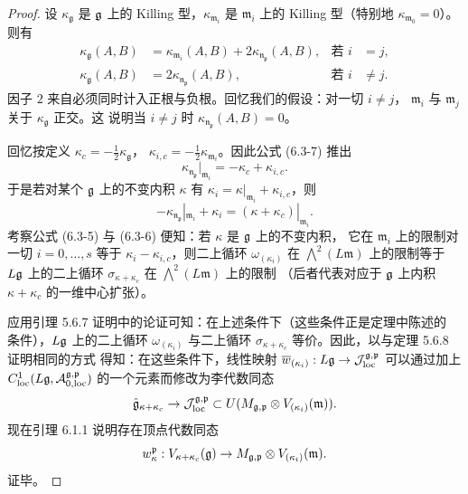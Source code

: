 \begin{proof}
    设 $\kappa_{\mathfrak g}$ 是 $\mathfrak{g}$ 上的 Killing 型，$\kappa_{\mathfrak m_i}$
    是 $\mathfrak m_i$ 上的 Killing 型（特别地 $\kappa_{\mathfrak m_0}=0$）。
    则有
    \begin{equation}
        \begin{aligned}
            \kappa_{\mathfrak g}(A,B)
            &=\kappa_{\mathfrak m_i}(A,B)
            +2\kappa_{\mathfrak n_{\mathfrak p}}(A,B),
            &\text{若 } i&=j,\\
            \kappa_{\mathfrak g}(A,B)
            &=2\kappa_{\mathfrak n_{\mathfrak p}}(A,B),
            &\text{若 } i&\ne j.
        \end{aligned}
        \tag{6.3-7}
    \end{equation}
    因子 $2$ 来自必须同时计入正根与负根。回忆我们的假设：对一切 $i\ne j$，
    $\mathfrak m_i$ 与 $\mathfrak m_j$ 关于 $\kappa_{\mathfrak g}$ 正交。这
    说明当 $i\ne j$ 时 $\kappa_{\mathfrak n_{\mathfrak p}}(A,B)=0$。

    回忆按定义 $\kappa_c=-\frac12\kappa_{\mathfrak g}$，
    $\kappa_{i,c}=-\frac12\kappa_{\mathfrak m_i}$。因此公式 (6.3-7) 推出
    \[
        \kappa_{\mathfrak n_{\mathfrak p}}|_{\mathfrak m_i}
        =-\kappa_c+\kappa_{i,c}.
    \]
    于是若对某个 $\mathfrak{g}$ 上的不变内积 $\kappa$ 有
    $\kappa_i=\kappa|_{\mathfrak m_i}+\kappa_{i,c}$，则
    \[
        -\kappa_{\mathfrak n_{\mathfrak p}}|_{\mathfrak m_i}+\kappa_i
        =(\kappa+\kappa_c)|_{\mathfrak m_i}.
    \]
    考察公式 (6.3-5) 与 (6.3-6) 便知：若 $\kappa$ 是 $\mathfrak{g}$ 上的不变内积，
    它在 $\mathfrak m_i$ 上的限制对一切 $i=0,\dots,s$ 等于
    $\kappa_i-\kappa_{i,c}$，则二上循环 $\omega_{(\kappa_i)}$ 在
    $\bigwedge^2(L\mathfrak m)$ 上的限制等于 $L\mathfrak{g}$ 上的二上循环
    $\sigma_{\kappa+\kappa_c}$ 在 $\bigwedge^2(L\mathfrak m)$ 上的限制
    （后者代表对应于 $\mathfrak{g}$ 上内积 $\kappa+\kappa_c$ 的一维中心扩张）。

    应用引理 5.6.7 证明中的论证可知：在上述条件下（这些条件正是定理中陈述的
    条件），$L\mathfrak{g}$ 上的二上循环 $\omega_{(\kappa_i)}$ 与二上循环
    $\sigma_{\kappa+\kappa_c}$ 等价。因此，以与定理 5.6.8 证明相同的方式
    得知：在这些条件下，线性映射
    $\overline w_{(\kappa_i)}:L\mathfrak{g}\to
    \mathcal{J}^{\mathfrak g,\mathfrak p}_{\mathrm{loc}}$ 可以通过加上
    $C^1_{\mathrm{loc}}(L\mathfrak{g},\mathcal{A}^{\mathfrak g,\mathfrak p}_{0,\mathrm{loc}})$
    的一个元素而修改为李代数同态
    \[
        \hat{\mathfrak{g}}_{\kappa+\kappa_c}\to\mathcal{J}^{\mathfrak g,\mathfrak p}_{\mathrm{loc}}
        \subset U(M_{\mathfrak g,\mathfrak p}\otimes
        V_{(\kappa_i)}(\mathfrak m)).
    \]
    现在引理 6.1.1 说明存在顶点代数同态
    \[
        w^{\mathfrak p}_\kappa:V_{\kappa+\kappa_c}(\mathfrak{g})
        \to M_{\mathfrak g,\mathfrak p}\otimes V_{(\kappa_i)}(\mathfrak m).
    \]
    证毕。
\end{proof}

